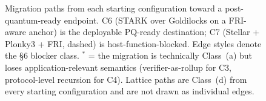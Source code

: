 \begin{figure}[t]
{}%
  \caption{Migration paths from each starting configuration toward a
    post-quantum-ready endpoint. C6 (STARK over Goldilocks on a
    FRI-aware anchor) is the deployable PQ-ready destination; C7
    (Stellar + Plonky3 + FRI, dashed) is host-function-blocked. Edge
    styles denote the §6 blocker class. $^\ast$ = the migration is
    technically Class~(a) but loses application-relevant semantics
    (verifier-as-rollup for C3, protocol-level recursion for C4).
    Lattice paths are Class~(d) from every starting configuration
    and are not drawn as individual edges.}
  \label{fig:migration}
\end{figure}
